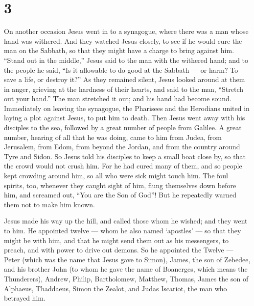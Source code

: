 \hypertarget{section-2}{%
\section{3}\label{section-2}}

 On another occasion Jesus went in to a synagogue, where
there was a man whose hand was withered.  And they watched
Jesus closely, to see if he would cure the man on the Sabbath, so that
they might have a charge to bring against him.  ``Stand out
in the middle,'' Jesus said to the man with the withered hand;
 and to the people he said, ``Is it allowable to do good at
the Sabbath --- or harm? To save a life, or destroy it?'' 
As they remained silent, Jesus looked around at them in anger, grieving
at the hardness of their hearts, and said to the man, ``Stretch out your
hand.'' The man stretched it out; and his hand had become sound.
 Immediately on leaving the synagogue, the Pharisees and the
Herodians united in laying a plot against Jesus, to put him to death.
 Then Jesus went away with his disciples to the sea,
followed by a great number of people from Galilee.  A great
number, hearing of all that he was doing, came to him from Judea, from
Jerusalem, from Edom, from beyond the Jordan, and from the country
around Tyre and Sidon.  So Jesus told his disciples to keep
a small boat close by, so that the crowd would not crush him.
 For he had cured many of them, and so people kept crowding
around him, so all who were sick might touch him.  The foul
spirits, too, whenever they caught sight of him, flung themselves down
before him, and screamed out, ``You are the Son of God''! 
But he repeatedly warned them not to make him known.

 Jesus made his way up the hill, and called those whom he
wished; and they went to him.  He appointed twelve --- whom
he also named `apostles' --- so that they might be with him, and that he
might send them out as his messengers, to preach,  and with
power to drive out demons.  So he appointed the Twelve ---
Peter (which was the name that Jesus gave to Simon), 
James, the son of Zebedee, and his brother John (to whom he gave the
name of Boanerges, which means the Thunderers),  Andrew,
Philip, Bartholomew, Matthew, Thomas, James the son of Alphaeus,
Thaddaeus, Simon the Zealot,  and Judas Iscariot, the man
who betrayed him.

